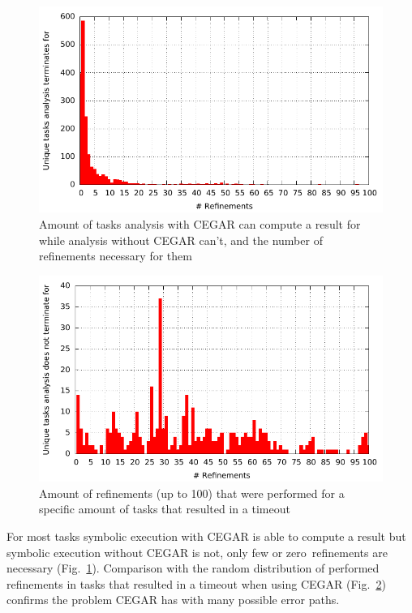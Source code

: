 \begin{figure}[h!]
\centering
\includegraphics{evaluation/hg_refinementsForUniqueCorrects}
\caption{Amount of tasks analysis with CEGAR can compute a result for while analysis without CEGAR can't, and the number of refinements necessary for them}
\label{fig:hgRefinementsForUniques}
\end{figure}
\begin{figure}[h!]
\centering
\includegraphics{evaluation/hg_refinementsForUniqueTimeouts}
\caption{Amount of refinements (up to 100) that were performed for a specific amount of tasks that resulted in a timeout}
\label{fig:hgRefinementsForTimeouts}
\end{figure}
For most tasks symbolic execution with CEGAR is able to compute a result but symbolic execution without CEGAR is not, only few or zero~refinements are necessary (Fig.~\ref{fig:hgRefinementsForUniques}).
Comparison with the random distribution of performed refinements in tasks that resulted in a timeout when using CEGAR (Fig.~\ref{fig:hgRefinementsForTimeouts}) confirms the problem CEGAR has with many possible error paths.

